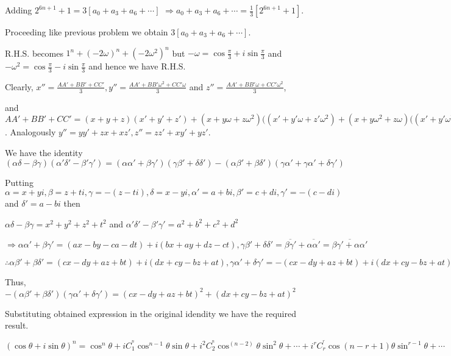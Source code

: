   Adding $2^{6n + 1} + 1 = 3[a_0 + a_3 + a_6 + \cdots]$
  $\Rightarrow a_0 + a_3 + a_6 + \cdots = \frac{1}{3}[2^{6n + 1} + 1]$.
\item Proceeding like previous problem we obtain $3[a_0 + a_3 + a_6 + \cdots]$.

  R.H.S. becomes $1^n + (-2\omega)^n + (-2\omega^2)^n$ but $-\omega = \cos\frac{\pi}{3} +
  i\sin\frac{\pi}{3}$ and $-\omega^2 = \cos\frac{\pi}{3} - i\sin\frac{\pi}{3}$ and hence we have R.H.S.
\item Clearly, $x'' = \frac{AA' + BB' + CC'}{3}, y'' = \frac{AA' + BB'\omega^2 + CC'\omega}{3}$ and $z'' =
  \frac{AA' + BB'\omega + CC'\omega^2}{3}$,

  and $AA' + BB' + CC' = (x + y + z)(x' + y' + z') + (x + y\omega + z\omega^2)((x' + y'\omega + z'\omega^2)
  + (x + y\omega^2 + z\omega)((x' + y'\omega^2 + z'\omega) = 3(xx' + zy' + yz')$. Analogously $y'' = yy' +
  zx + xz', z'' = zz' + xy' + yz'$.
\item We have the identity $(\alpha\delta - \beta\gamma)(\alpha'\delta' - \beta'\gamma') = (\alpha\alpha' +
  \beta\gamma')(\gamma\beta' + \delta\delta') - (\alpha\beta' + \beta\delta')(\gamma\alpha' + \gamma\alpha'
  + \delta\gamma')$

  Putting $\alpha = x + yi, \beta = z + ti, \gamma = -(z - ti), \delta = x - yi, \alpha' = a + bi, \beta' =
  c + di, \gamma' = -(c - di)$ and $\delta' = a - bi$ then

  $\alpha\delta - \beta\gamma = x^2 + y^2 + z^2 + t^2$ and $\alpha'\delta' - \beta'\gamma' = a^2 + b^2 + c^2
  + d^2$

  $\Rightarrow \alpha\alpha' + \beta\gamma' = (ax - by - ca - dt) + i(bx + ay + dz - ct), \gamma\beta' +
  \delta\delta' = \overline{\beta\gamma'} + \overline{\alpha\alpha'} = \overline{\beta\gamma' +
    \alpha\alpha'}$

  $\therefore \alpha\beta' + \beta\delta' = (cx - dy + az + bt) + i(dx + cy - bz + at), \gamma\alpha' +
  \delta\gamma' = -(cx - dy + az + bt) + i(dx + cy - bz + at)$

  Thus, $-(\alpha\beta' + \beta\delta')(\gamma\alpha' + \delta\gamma') = (cx - dy + az + bt)^2 + (dx + cy -
  bz + at)^2$

  Substituting obtained expression in the original idendity we have the required result.
\item $(\cos\theta + i\sin\theta)^n = \cos^n\theta + iC_1^^n\cos^{n - 1}\theta\sin\theta +
  i^2C_2^^n\cos^{(n - 2)}\theta\sin^2\theta + \cdots + i^rC_r^^r\cos{(n - r + 1)}\theta\sin^{r - 1}\theta +
  \cdots$

